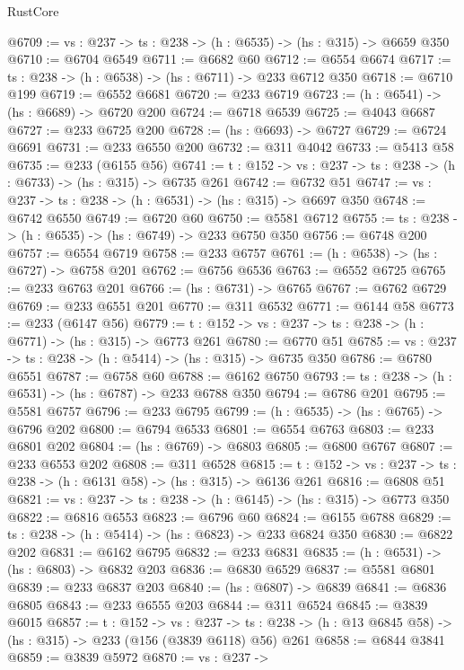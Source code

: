 \begin{lexlean}{RustCore}
\begin{coremodule}
@6709 := {vs : @237} -> {ts : @238} -> (h : @6535) -> (hs : @315) -> @6659 @350
@6710 := @6704 @6549
@6711 := @6682 @60
@6712 := @6554 @6674
@6717 := {ts : @238} -> (h : @6538) -> (hs : @6711) -> @233 @6712 @350
@6718 := @6710 @199
@6719 := @6552 @6681
@6720 := @233 @6719
@6723 := (h : @6541) -> (hs : @6689) -> @6720 @200
@6724 := @6718 @6539
@6725 := @4043 @6687
@6727 := @233 @6725 @200
@6728 := (hs : @6693) -> @6727
@6729 := @6724 @6691
@6731 := @233 @6550 @200
@6732 := @311 @4042
@6733 := @5413 @58
@6735 := @233 (@6155 @56)
@6741 := {t : @152} -> {vs : @237} -> {ts : @238} -> (h : @6733) -> (hs : @315) -> @6735 @261
@6742 := @6732 @51
@6747 := {vs : @237} -> {ts : @238} -> (h : @6531) -> (hs : @315) -> @6697 @350
@6748 := @6742 @6550
@6749 := @6720 @60
@6750 := @5581 @6712
@6755 := {ts : @238} -> (h : @6535) -> (hs : @6749) -> @233 @6750 @350
@6756 := @6748 @200
@6757 := @6554 @6719
@6758 := @233 @6757
@6761 := (h : @6538) -> (hs : @6727) -> @6758 @201
@6762 := @6756 @6536
@6763 := @6552 @6725
@6765 := @233 @6763 @201
@6766 := (hs : @6731) -> @6765
@6767 := @6762 @6729
@6769 := @233 @6551 @201
@6770 := @311 @6532
@6771 := @6144 @58
@6773 := @233 (@6147 @56)
@6779 := {t : @152} -> {vs : @237} -> {ts : @238} -> (h : @6771) -> (hs : @315) -> @6773 @261
@6780 := @6770 @51
@6785 := {vs : @237} -> {ts : @238} -> (h : @5414) -> (hs : @315) -> @6735 @350
@6786 := @6780 @6551
@6787 := @6758 @60
@6788 := @6162 @6750
@6793 := {ts : @238} -> (h : @6531) -> (hs : @6787) -> @233 @6788 @350
@6794 := @6786 @201
@6795 := @5581 @6757
@6796 := @233 @6795
@6799 := (h : @6535) -> (hs : @6765) -> @6796 @202
@6800 := @6794 @6533
@6801 := @6554 @6763
@6803 := @233 @6801 @202
@6804 := (hs : @6769) -> @6803
@6805 := @6800 @6767
@6807 := @233 @6553 @202
@6808 := @311 @6528
@6815 := {t : @152} -> {vs : @237} -> {ts : @238} -> (h : @6131 @58) -> (hs : @315) -> @6136 @261
@6816 := @6808 @51
@6821 := {vs : @237} -> {ts : @238} -> (h : @6145) -> (hs : @315) -> @6773 @350
@6822 := @6816 @6553
@6823 := @6796 @60
@6824 := @6155 @6788
@6829 := {ts : @238} -> (h : @5414) -> (hs : @6823) -> @233 @6824 @350
@6830 := @6822 @202
@6831 := @6162 @6795
@6832 := @233 @6831
@6835 := (h : @6531) -> (hs : @6803) -> @6832 @203
@6836 := @6830 @6529
@6837 := @5581 @6801
@6839 := @233 @6837 @203
@6840 := (hs : @6807) -> @6839
@6841 := @6836 @6805
@6843 := @233 @6555 @203
@6844 := @311 @6524
@6845 := @3839 @6015
@6857 := {t : @152} ->
  {vs : @237} ->
  {ts : @238} -> (h : @13 @6845 @58) -> (hs : @315) -> @233 (@156 (@3839 @6118) @56) @261
@6858 := @6844 @3841
@6859 := @3839 @5972
@6870 := {vs : @237} ->

\end{coremodule}
\end{lexlean}
